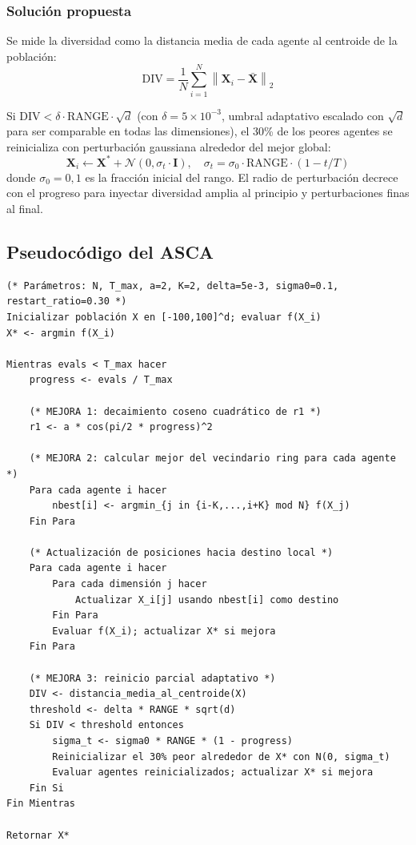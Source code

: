 \documentclass[12pt,a4paper]{article}
\begin{document}
\subsubsection{Solución propuesta}

Se mide la diversidad como la distancia media de cada agente al centroide de la población:
\begin{equation}
  \text{DIV} = \frac{1}{N} \sum_{i=1}^{N} \left\| \mathbf{X}_i - \bar{\mathbf{X}} \right\|_2
  \label{eq:div}
\end{equation}

Si $\text{DIV} < \delta \cdot \text{RANGE} \cdot \sqrt{d}$ (con $\delta = 5 \times 10^{-3}$, umbral adaptativo escalado con $\sqrt{d}$ para ser comparable en todas las dimensiones), el 30\% de los peores agentes se reinicializa con perturbación gaussiana alrededor del mejor global:
\begin{equation}
  \mathbf{X}_i \leftarrow \mathbf{X}^* + \mathcal{N}(0, \sigma_t \cdot \mathbf{I}), \quad
  \sigma_t = \sigma_0 \cdot \text{RANGE} \cdot (1 - t/T)
  \label{eq:restart}
\end{equation}
donde $\sigma_0 = 0{,}1$ es la fracción inicial del rango. El radio de perturbación decrece con el progreso para inyectar diversidad amplia al principio y perturbaciones finas al final.

\subsection{Pseudocódigo del ASCA}

\begin{lstlisting}[caption={Pseudocódigo del ASCA}, label={lst:asca}]
(* Parámetros: N, T_max, a=2, K=2, delta=5e-3, sigma0=0.1, restart_ratio=0.30 *)
Inicializar población X en [-100,100]^d; evaluar f(X_i)
X* <- argmin f(X_i)

Mientras evals < T_max hacer
    progress <- evals / T_max

    (* MEJORA 1: decaimiento coseno cuadrático de r1 *)
    r1 <- a * cos(pi/2 * progress)^2

    (* MEJORA 2: calcular mejor del vecindario ring para cada agente *)
    Para cada agente i hacer
        nbest[i] <- argmin_{j in {i-K,...,i+K} mod N} f(X_j)
    Fin Para

    (* Actualización de posiciones hacia destino local *)
    Para cada agente i hacer
        Para cada dimensión j hacer
            Actualizar X_i[j] usando nbest[i] como destino
        Fin Para
        Evaluar f(X_i); actualizar X* si mejora
    Fin Para

    (* MEJORA 3: reinicio parcial adaptativo *)
    DIV <- distancia_media_al_centroide(X)
    threshold <- delta * RANGE * sqrt(d)
    Si DIV < threshold entonces
        sigma_t <- sigma0 * RANGE * (1 - progress)
        Reinicializar el 30% peor alrededor de X* con N(0, sigma_t)
        Evaluar agentes reinicializados; actualizar X* si mejora
    Fin Si
Fin Mientras

Retornar X*
\end{lstlisting}
\end{document}
